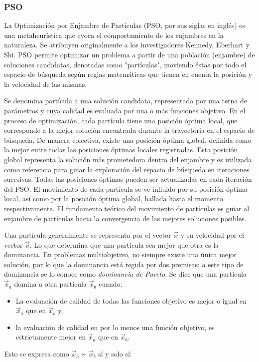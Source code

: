 \documentclass[sigplan,screen]{acmart}
\begin{document}
\subsubsection{PSO \cite{Kennedy1995}}
La Optimización por Enjambre de Partículas (PSO, por sus siglas en inglés) es una metaheurística que evoca el comportamiento de los enjambres en la naturaleza. Se atribuyen originalmente a los investigadores Kennedy, Eberhart y Shi. PSO permite optimizar un problema a partir de una población (enjambre) de soluciones candidatas, denotadas como "partículas", moviendo éstas por todo el espacio de búsqueda según reglas matemáticas que tienen en cuenta la posición y la velocidad de las mismas.\par
Se denomina partícula a una solución candidata, representada por una terna de parámetros y cuya calidad es evaluada por una o más funciones objetivo. En el proceso de optimización, cada partícula tiene una posición óptima local, que corresponde a la mejor solución encontrada durante la trayectoria en el espacio de búsqueda. De manera colectiva, existe una posición óptima global, definida como la mejor entre todas las posiciones óptimas locales registradas. Esta posición  global representa la solución más prometedora dentro del enjambre y es utilizada como referencia para guiar la exploración del espacio de búsqueda en iteraciones sucesivas. Todas las posiciones óptimas pueden ser actualizadas en cada iteración del PSO. El movimiento de cada partícula se ve influido por su posición óptima local, así como por la posición óptima global, hallada hasta el momento respectivamente. El fundamento teórico del movimiento de partículas es guiar al enjambre de partículas hacia la convergencia de las mejores soluciones posibles.\par
Una partícula generalmente se representa por el vector $\vec{x}$ y su velocidad por el vector $\vec{v}$. Lo que determina que una partícula sea mejor que otra es la dominancia. En problemas multiobjetivo, no siempre existe una única mejor solución, por lo que la dominancia está regida por dos premisas; a este tipo de dominancia se lo conoce como \textit{dominancia de Pareto}. Se dice que una partícula $\vec{x}_a$ domina a otra partícula $\vec{x}_b$ cuando:
\begin{itemize}
    \item La evaluación de calidad de todas las funciones objetivo es mejor o igual en $\vec{x}_a$ que en $\vec{x}_b$ y,
    \item la evaluación de calidad en por lo menos una función objetivo, es estrictamente mejor en $\vec{x}_a$ que en $\vec{x}_b$.
\end{itemize}
Esto  se expresa como $\vec{x}_a\succ \vec{x}_b$ sí y solo sí:
\end{document}
